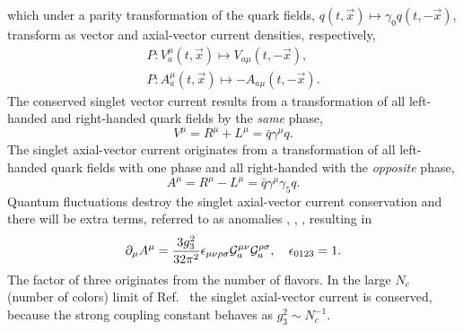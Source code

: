 \documentclass[twoside,12pt]{article}
\begin{document}
which under a parity transformation of the quark fields,
$q(t,\vec x)\mapsto \gamma_0 q(t,-\vec x)$,
transform as vector and axial-vector current densities,
respectively,
\begin{eqnarray}
\label{2:1:3:pv}
P:V^{\mu}_a(t,\vec{x})\mapsto V_{a\mu}(t,-\vec{x}),\\
\label{2:1:3pa} P: A^{\mu}_a(t,\vec{x})\mapsto -A_{a\mu}(t,-\vec{x}).
\end{eqnarray}
   The conserved singlet vector current results from a transformation of all
left-handed and right-handed quark fields by the {\em same} phase,
\begin{equation}
\label{2:1:3:sv}
V^\mu=R^{\mu}+L^{\mu}=\bar{q}\gamma^\mu q.
\end{equation}
   The singlet axial-vector current originates from a transformation of all left-handed
quark fields with one phase and all right-handed with the {\em
opposite} phase,
\begin{equation}
\label{2:1:3:sav}
A^\mu= R^{\mu}-L^{\mu}=\bar{q}\gamma^\mu\gamma_5q.
\end{equation}
   Quantum fluctuations destroy the singlet axial-vector current conservation
and there will be extra terms, referred to as anomalies \cite{Bell:1969ts}, \cite{Adler:1969gk},
\cite{Adler:1969er}, resulting in
\begin{displaymath}
\partial_\mu A^\mu=\frac{3 g^2_3}{32\pi^2}\epsilon_{\mu\nu\rho\sigma}
{\cal G}^{\mu\nu}_a {\cal G}^{\rho\sigma}_a,\quad \epsilon_{0123}=1.
\end{displaymath}
   The factor of three originates from the number of flavors.
   In the large $N_c$ (number of colors) limit of Ref.~\cite{'tHooft:1973jz} the singlet axial-vector
current is conserved, because the strong coupling constant behaves
as $g^2_3\sim N_c^{-1}$.
\end{document}
